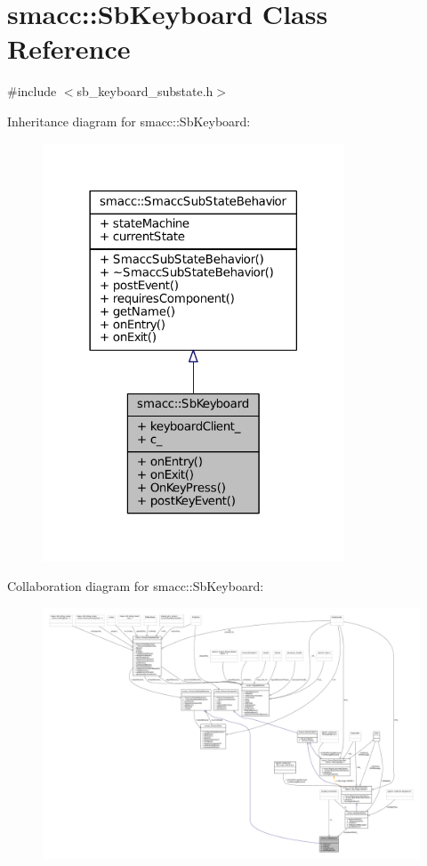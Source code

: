 \hypertarget{classsmacc_1_1SbKeyboard}{}\section{smacc\+:\+:Sb\+Keyboard Class Reference}
\label{classsmacc_1_1SbKeyboard}


{\ttfamily \#include $<$sb\+\_\+keyboard\+\_\+substate.\+h$>$}



Inheritance diagram for smacc\+:\+:Sb\+Keyboard\+:
\nopagebreak
\begin{figure}[H]
\begin{center}
\leavevmode
\includegraphics[width=254pt]{classsmacc_1_1SbKeyboard__inherit__graph}
\end{center}
\end{figure}


Collaboration diagram for smacc\+:\+:Sb\+Keyboard\+:
\nopagebreak
\begin{figure}[H]
\begin{center}
\leavevmode
\includegraphics[width=350pt]{classsmacc_1_1SbKeyboard__coll__graph}
\end{center}
\end{figure}
